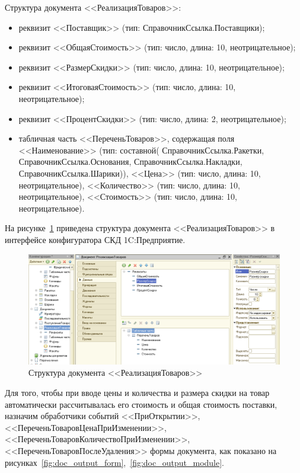 \pagebreak
Структура документа <<РеализацияТоваров>>:
\begin{itemize}
\item реквизит <<Поставщик>> (тип: СправочникСсылка.Поставщики);
\item реквизит <<ОбщаяСтоимость>> (тип: число, длина: 10, неотрицательное);
\item реквизит <<РазмерСкидки>> (тип: число, длина: 10, неотрицательное);
\item реквизит <<ИтоговаяСтоимость>> (тип: число, длина: 10, неотрицательное);
\item реквизит <<ПроцентСкидки>> (тип: число, длина: 2, неотрицательное);
\item табличная часть <<ПереченьТоваров>>, содержащая поля
  <<Наименование>> (тип: составной(%
  СправочникСсылка.Ракетки,
  СправочникСсылка.Основания,
  СправочникСсылка.Накладки,
  СправочникСсылка.Шарики)),
  <<Цена>> (тип: число, длина: 10, неотрицательное),
  <<Количество>> (тип: число, длина: 10, неотрицательное),
  <<Стоимость>> (тип: число, длина: 10, неотрицательное).
\end{itemize}

На рисунке~\ref{fig:doc_output} приведена
структура документа <<РеализацияТоваров>> в интерфейсе конфигуратора
СКД 1C:Предприятие.

\begin{figure}[h!]
  \centering
  \includegraphics[width=150mm]{pic/doc_output}
  \caption{Структура документа <<РеализацияТоваров>>}
  \label{fig:doc_output}
\end{figure}

Для того, чтобы при вводе цены и количества и размера скидки на товар автоматически
рассчитывалась его стоимость и общая стоимость
поставки, назначим обработчики событий
<<ПриОткрытии>>,
<<ПереченьТоваровЦенаПриИзменении>>,
<<ПереченьТоваровКоличествоПриИзменении>>,
<<ПереченьТоваровПослеУдаления>>
формы документа, как показано на
рисунках~\ref{fig:doc_output_form},~\ref{fig:doc_output_module}.

